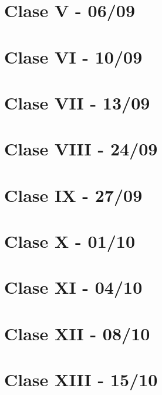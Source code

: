 \documentclass[12pt,a4paper]{book}
\begin{document}
\chapter{Clase V - 06/09}

\newpage\thispagestyle{empty}\blankpage

\chapter{Clase VI - 10/09}

\newpage\thispagestyle{empty}\blankpage

\chapter{Clase VII - 13/09}

\newpage\thispagestyle{empty}\blankpage

\chapter{Clase VIII - 24/09}

\newpage\thispagestyle{empty}\blankpage

\chapter{Clase IX - 27/09}

\newpage\thispagestyle{empty}\blankpage

\chapter{Clase X - 01/10}

\newpage\thispagestyle{empty}\blankpage

\chapter{Clase XI - 04/10}

\newpage\thispagestyle{empty}\blankpage

\chapter{Clase XII - 08/10}

\newpage\thispagestyle{empty}\blankpage

\chapter{Clase XIII - 15/10}

\newpage\thispagestyle{empty}\blankpage
\end{document}
